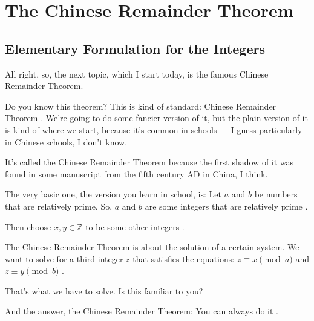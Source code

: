 \section{The Chinese Remainder Theorem}

\subsection{Elementary Formulation for the Integers}

\begin{speech}[01:07:17 - 01:08:58]
All right, so, the next topic, which I start today, is the famous Chinese Remainder Theorem.

Do you know this theorem? This is kind of standard: Chinese Remainder Theorem . We're going to do some fancier version of it, but the plain version of it is kind of where we start, because it's common in schools --- I guess particularly in Chinese schools, I don't know.

It's called the Chinese Remainder Theorem because the first shadow of it was found in some manuscript from the fifth century AD in China, I think.

The very basic one, the version you learn in school, is: Let $a$ and $b$ be numbers that are relatively prime. So, $a$ and $b$ are some integers that are relatively prime .

Then choose $x, y \in \mathbb{Z}$ to be some other integers .

The Chinese Remainder Theorem is about the solution of a certain system. We want to solve for a third integer $z$ that satisfies the equations: $z \equiv x \pmod a$ and $z \equiv y \pmod b$ .

That's what we have to solve. Is this familiar to you?

And the answer, the Chinese Remainder Theorem: You can always do it .
\end{speech}

\begin{content}
\end{content}

